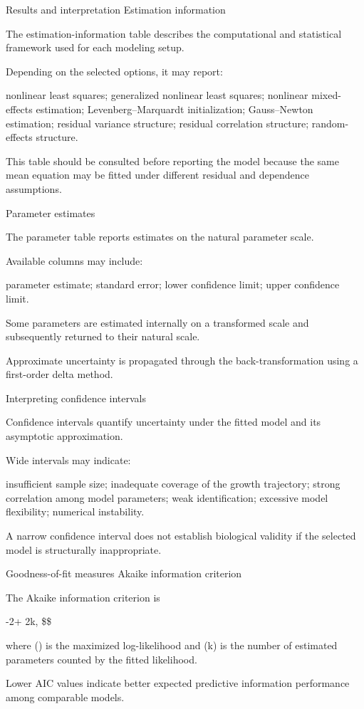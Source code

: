 \documentclass[
  english,
  letterpaper,
  DIV=11,
  numbers=noendperiod]{scrreprt}
\begin{document}
Results and interpretation Estimation information

The estimation-information table describes the computational and
statistical framework used for each modeling setup.

Depending on the selected options, it may report:

nonlinear least squares; generalized nonlinear least squares; nonlinear
mixed-effects estimation; Levenberg--Marquardt initialization;
Gauss--Newton estimation; residual variance structure; residual
correlation structure; random-effects structure.

This table should be consulted before reporting the model because the
same mean equation may be fitted under different residual and dependence
assumptions.

Parameter estimates

The parameter table reports estimates on the natural parameter scale.

Available columns may include:

parameter estimate; standard error; lower confidence limit; upper
confidence limit.

Some parameters are estimated internally on a transformed scale and
subsequently returned to their natural scale.

Approximate uncertainty is propagated through the back-transformation
using a first-order delta method.

Interpreting confidence intervals

Confidence intervals quantify uncertainty under the fitted model and its
asymptotic approximation.

Wide intervals may indicate:

insufficient sample size; inadequate coverage of the growth trajectory;
strong correlation among model parameters; weak identification;
excessive model flexibility; numerical instability.

A narrow confidence interval does not establish biological validity if
the selected model is structurally inappropriate.

Goodness-of-fit measures Akaike information criterion

The Akaike information criterion is

-2\ell + 2k, \$\$

where (\ell) is the maximized log-likelihood and (k) is the number of
estimated parameters counted by the fitted likelihood.

Lower AIC values indicate better expected predictive information
performance among comparable models.
\end{document}
